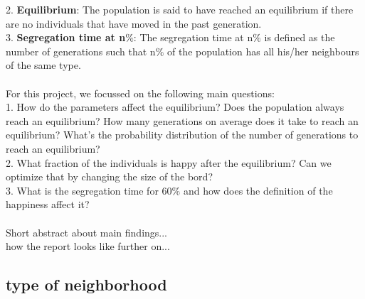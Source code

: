 \documentclass{article}
\begin{document}
2. \textbf{Equilibrium}: The population is said to have reached an equilibrium if there are no individuals that have moved in the past generation.\\
3. \textbf{Segregation time at n$\%$}: The segregation time at n$\%$ is defined as the number of generations such that n$\%$ of the population has all his/her neighbours of the same type.
\\
\\
For this project, we focussed on the following main questions:\\
1. How do the parameters affect the equilibrium? Does the population always reach an equilibrium? How many generations on average does it take to reach an equilibrium? What's the probability distribution of the number of generations to reach an equilibrium?\\
2. What fraction of the individuals is happy after the equilibrium? Can we optimize that by changing the size of the bord?\\
3. What is the segregation time for 60$\%$ and how does the definition of the happiness affect it?\\
\\
Short abstract about main findings...\\
how the report looks like further on...




\subsection{type of neighborhood}
\end{document}
